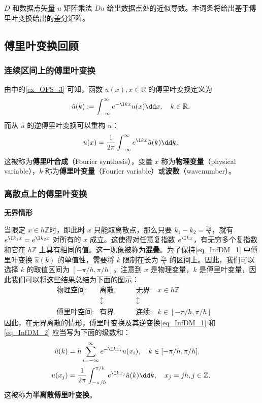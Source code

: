 

 $D$ 和数据点矢量 $u$ 矩阵乘法 $Du$ 给出数据点处的近似导数。本词条将给出基于傅里叶变换给出的差分矩阵。
\subsection{傅里叶变换回顾}
\subsubsection{连续区间上的傅里叶变换}
由中的\autoref{ex_OFS_3} 可知，函数 $u(x),x\in\mathbb R$ 的傅里叶变换定义为
\begin{equation}\label{eq_InfDM_1}
\hat u(k):=\int_{-\infty}^{\infty} e^{-\I kx}u(x)\dd x,\quad k\in\mathbb R.~
\end{equation}
而从 $\hat u$ 的逆傅里叶变换可以重构 $u$：
\begin{equation}\label{eq_InfDM_2}
u(x)=\frac{1}{2\pi}\int_{-\infty}^{\infty} e^{\I kx}\hat u(k)\dd k.~
\end{equation}
这被称为\textbf{傅里叶合成}（Fourier synthesis），变量 $x$ 称为\textbf{物理变量}（physical variable），$k$ 称为\textbf{傅里叶变量}（Fourier variable）或\textbf{波数}（wavenumber）。

\subsubsection{离散点上的傅里叶变换}
\textbf{无界情形}

当限定 $x\in h\mathbb Z$时，即此时 $x$ 只能取离散点，那么只要 $k_1-k_2=\frac{2\pi}{h}$，就有 $e^{\I k_1x}=e^{\I k_2x}$ 对所有的 $x$ 成立。这使得对任意复指数 $e^{\I kx}$，有无穷多个复指数和它在 $h\mathbb Z$ 上具有相同的值。这一现象被称为\textbf{混叠}。为了保持\autoref{eq_InfDM_1} 中傅里叶变换 $\hat u(k)$ 的单值性，需要将 $k$ 限制在长为 $\frac{2\pi}{h}$ 的区间上。因此，我们可以选择 $k$ 的取值区间为 $[-\pi/h,\pi/h]$。注意到 $x$ 是物理变量，$k$ 是傅里叶变量，因此我们可以将这些结果总结为下面的图示：
\begin{equation}
\begin{aligned}
&\text{物理空间:}& \text{离散},&\qquad\text{无界:} &x\in h\mathbb Z\\
&&\updownarrow&\qquad\updownarrow&\\
&\text{傅里叶空间:}& \text{有界},&\qquad\text{连续:} &k\in [-\pi/h,\pi/h]
\end{aligned}~
\end{equation}
因此，在无界离散的情形，傅里叶变换及其逆变换\autoref{eq_InfDM_1} 和\autoref{eq_InfDM_2} 应当写为下面的级数和：
\begin{equation}\label{eq_InfDM_3}
\begin{aligned}
\hat u(k)&=h\sum_{i=-\infty}^{\infty}e^{-\I kx_i}u(x_i),\quad k\in[-\pi/h,\pi/h],\\
u(x_j)&=\frac{1}{2\pi}\int_{-\pi/h}^{\pi/h} e^{\I kx_j}\hat u(k)\dd k,\quad x_j=jh,j\in \mathbb Z.
\end{aligned}~
\end{equation}
这被称为\textbf{半离散傅里叶变换}。

